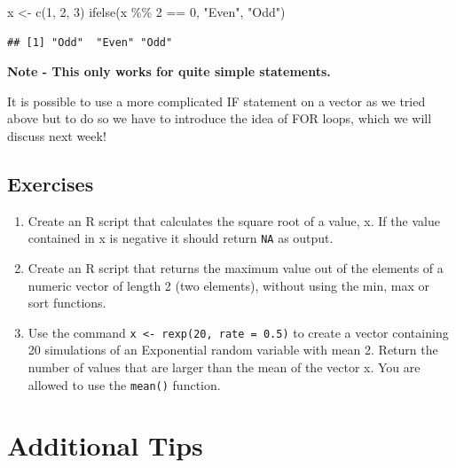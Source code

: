 \documentclass[
]{book}
\newenvironment{Shaded}{\begin{snugshade}}{\end{snugshade}}
\newcommand{\DecValTok}[1]{\textcolor[rgb]{0.00,0.00,0.81}{#1}}
\newcommand{\FunctionTok}[1]{\textcolor[rgb]{0.00,0.00,0.00}{#1}}
\newcommand{\NormalTok}[1]{#1}
\newcommand{\OtherTok}[1]{\textcolor[rgb]{0.56,0.35,0.01}{#1}}
\newcommand{\SpecialCharTok}[1]{\textcolor[rgb]{0.00,0.00,0.00}{#1}}
\newcommand{\StringTok}[1]{\textcolor[rgb]{0.31,0.60,0.02}{#1}}
\theoremstyle{definition}
\theoremstyle{definition}
\theoremstyle{definition}
\theoremstyle{definition}
\theoremstyle{remark}
\begin{document}
\begin{Shaded}
\begin{Highlighting}[]
\NormalTok{x }\OtherTok{\textless{}{-}} \FunctionTok{c}\NormalTok{(}\DecValTok{1}\NormalTok{, }\DecValTok{2}\NormalTok{, }\DecValTok{3}\NormalTok{)}
\FunctionTok{ifelse}\NormalTok{(x }\SpecialCharTok{\%\%} \DecValTok{2} \SpecialCharTok{==} \DecValTok{0}\NormalTok{, }\StringTok{"Even"}\NormalTok{, }\StringTok{"Odd"}\NormalTok{)}
\end{Highlighting}
\end{Shaded}

\begin{verbatim}
## [1] "Odd"  "Even" "Odd"
\end{verbatim}

\textbf{Note - This only works for quite simple statements.}

It is possible to use a more complicated IF statement on a vector as we tried above but to do so we have to introduce the idea of FOR loops, which we will discuss next week!

\hypertarget{exercises-3}{%
\section{Exercises}\label{exercises-3}}

\begin{enumerate}
\def\labelenumi{\arabic{enumi}.}
\item
  Create an R script that calculates the square root of a value, x. If the value contained in x is negative it should return \texttt{NA} as output.
\item
  Create an R script that returns the maximum value out of the elements of a numeric vector of length 2 (two elements), without using the min, max or sort functions.
\item
  Use the command \texttt{x\ \textless{}-\ rexp(20,\ rate\ =\ 0.5)} to create a vector containing 20 simulations of an Exponential random variable with mean 2. Return the number of values that are larger than the mean of the vector x. You are allowed to use the \texttt{mean()} function.
\end{enumerate}

\hypertarget{appendix-appendix}{%
\appendix}


\hypertarget{additional-tips}{%
\chapter{Additional Tips}\label{additional-tips}}
\end{document}
